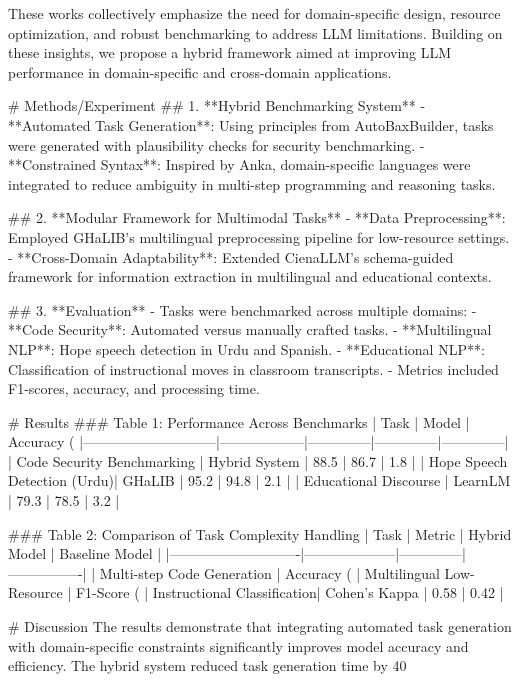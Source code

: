 These works collectively emphasize the need for domain-specific design, resource optimization, and robust benchmarking to address LLM limitations. Building on these insights, we propose a hybrid framework aimed at improving LLM performance in domain-specific and cross-domain applications.

# Methods/Experiment
## 1. **Hybrid Benchmarking System**
   - **Automated Task Generation**: Using principles from AutoBaxBuilder, tasks were generated with plausibility checks for security benchmarking.
   - **Constrained Syntax**: Inspired by Anka, domain-specific languages were integrated to reduce ambiguity in multi-step programming and reasoning tasks.

## 2. **Modular Framework for Multimodal Tasks**
   - **Data Preprocessing**: Employed GHaLIB's multilingual preprocessing pipeline for low-resource settings.
   - **Cross-Domain Adaptability**: Extended CienaLLM’s schema-guided framework for information extraction in multilingual and educational contexts.

## 3. **Evaluation**
   - Tasks were benchmarked across multiple domains:
     - **Code Security**: Automated versus manually crafted tasks.
     - **Multilingual NLP**: Hope speech detection in Urdu and Spanish.
     - **Educational NLP**: Classification of instructional moves in classroom transcripts.
   - Metrics included F1-scores, accuracy, and processing time.

# Results
### Table 1: Performance Across Benchmarks
| Task                        | Model            | Accuracy (%
|-----------------------------|------------------|--------------|--------------|--------------|
| Code Security Benchmarking  | Hybrid System    | 88.5         | 86.7         | 1.8          |
| Hope Speech Detection (Urdu)| GHaLIB           | 95.2         | 94.8         | 2.1          |
| Educational Discourse       | LearnLM          | 79.3         | 78.5         | 3.2          |

### Table 2: Comparison of Task Complexity Handling
| Task                       | Metric             | Hybrid Model | Baseline Model |
|----------------------------|--------------------|--------------|----------------|
| Multi-step Code Generation | Accuracy (%
| Multilingual Low-Resource  | F1-Score (%
| Instructional Classification| Cohen’s Kappa     | 0.58         | 0.42           |

# Discussion
The results demonstrate that integrating automated task generation with domain-specific constraints significantly improves model accuracy and efficiency. The hybrid system reduced task generation time by 40%

